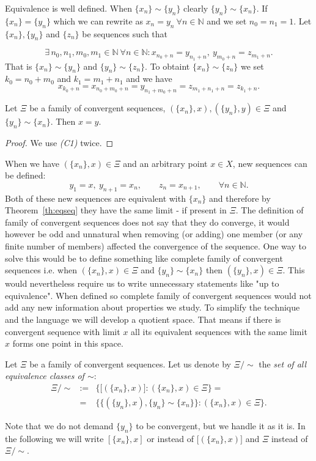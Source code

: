 {\color{blue}

Equivalence is well defined. When $\{x_n\} \sim \{y_n\}$ clearly $\{y_n\} \sim \{x_n\}$.
If $\{x_n\} = \{y_n\}$ which we can rewrite as $x_n = y_n\ \forall n \in \mathbb{N}$ and we set $n_0 = n_1 = 1$. Let $\{x_n\}, \{y_n\}$ and $\{z_n\}$ be sequences such that

\[
	\exists\, n_0, n_1, m_0, m_1 \in \mathbb{N}\ \forall n \in \mathbb{N}: x_{n_0+n}=y_{n_1+n},\ y_{m_0+n}=z_{m_1+n}.
\]
That is $\{x_n\} \sim \{y_n\}$ and $\{y_n\} \sim \{z_n\}$.  To obtaint $\{x_n\} \sim \{z_n\}$ we set $k_0=n_0+m_0$ and $k_1=m_1+n_1$ and we have
\[
	x_{k_0+n}=x_{n_0+m_0+n}=y_{n_1+m_0+n}=z_{m_1+n_1+n}=z_{k_1+n}.
\]


\begin{theorem} \label{th:eqseq}
Let $\Xi$ be a family of convergent sequences, $(\{x_n\},x), (\{y_n\},y)\in\Xi$ and $\{y_n\} \sim \{x_n\}$. Then $x=y$.
\end{theorem} 
\begin{proof}
We use \emph{(C1)} twice.
\end{proof}

When we have $(\{x_n\},x)\in\Xi$ and an arbitrary point $x\in X$, new sequences can be defined:
\[
	y_1=x,\ y_{n+1}=x_n,\qquad z_n=x_{n+1},\qquad\forall n\in \mathbb{N}.
\]
Both of these new sequences are equivalent with $\{x_n\}$ and therefore by Theorem~\ref{th:eqseq} they have the same limit - if present in $\Xi$. The definition of family of convergent sequences does not say that they do converge, it would however be odd and unnatural when removing (or adding) one member (or any finite number of members) affected the convergence of the sequence. One way to solve this would be to define something like complete family of convergent sequences i.e. when $(\{x_n\},x)\in\Xi$ and $\{y_n\} \sim \{x_n\}$ then $(\{y_n\},x)\in\Xi$. This would nevertheless require us to write unnecessary statements like "up to equivalence". When defined so complete family of convergent sequences would not add any new information about properties we study. To simplify the technique and the language we will develop a quotient space. That means if there is convergent sequence with limit $x$ all its equivalent sequences with the same limit $x$ forms one point in this space. 

\begin{define}\label{def:quosp}
Let $\Xi$ be a family of convergent sequences. Let us denote by $\Xi/\!\sim$ the \emph{set of all equivalence classes of $\sim$}:
\begin{eqnarray}
	\Xi/\!\sim & := & \bigg\{\Big[(\{x_n\},x)\Big] : (\{x_n\},x)\in\Xi \bigg\} = \nonumber\\
	& {}= & \bigg\{\Big\{(\{y_n\},x), \{y_n\} \sim \{x_n\}\Big\} : (\{x_n\},x)\in\Xi \bigg\}.\nonumber
\end{eqnarray}
\end{define}

Note that we do not demand $ \{y_n\}$ to be convergent, but we handle it as it is. In the following we will write $[\{x_n\},x]$ or instead of $[(\{x_n\},x)\Big]$ and $\Xi$ instead of $\Xi/\!\sim$.

}
